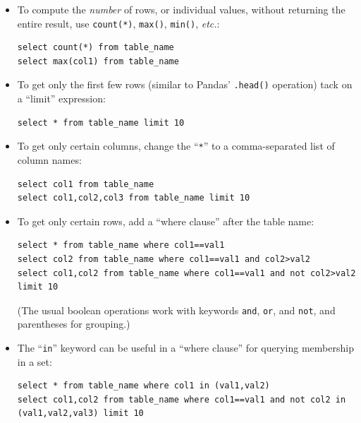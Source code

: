 \documentclass[12pt]{article}
\begin{document}
\begin{itemize}
\itemsep.1em
\item To compute the \textit{number} of rows, or individual values, without
returning the entire result, use \texttt{count(*)}, \texttt{max()},
\texttt{min()}, \textit{etc.}:

\footnotesize
\begin{Verbatim}[fontsize=\small,samepage=true,frame=none]
select count(*) from table_name
select max(col1) from table_name
\end{Verbatim}
\normalsize

\item To get only the first few rows (similar to Pandas' \texttt{.head()}
operation) tack on a ``limit'' expression:

\footnotesize
\begin{Verbatim}[fontsize=\small,samepage=true,frame=none]
select * from table_name limit 10
\end{Verbatim}
\normalsize

\item To get only certain columns, change the ``\texttt{*}'' to a
comma-separated list of column names:

\footnotesize
\begin{Verbatim}[fontsize=\small,samepage=true,frame=none]
select col1 from table_name
select col1,col2,col3 from table_name limit 10
\end{Verbatim}
\normalsize

\item To get only certain rows, add a ``where clause'' after the table name:

\footnotesize
\begin{Verbatim}[fontsize=\small,samepage=true,frame=none]
select * from table_name where col1==val1
select col2 from table_name where col1==val1 and col2>val2
select col1,col2 from table_name where col1==val1 and not col2>val2 limit 10
\end{Verbatim}
\normalsize

(The usual boolean operations work with keywords \texttt{and}, \texttt{or},
and \texttt{not}, and parentheses for grouping.)

\item The ``\texttt{in}'' keyword can be useful in a ``where clause'' for
querying membership in a set:

\scriptsize
\begin{Verbatim}[fontsize=\small,samepage=true,frame=none]
select * from table_name where col1 in (val1,val2)
select col1,col2 from table_name where col1==val1 and not col2 in (val1,val2,val3) limit 10
\end{Verbatim}
\normalsize


\end{itemize}
\end{document}
